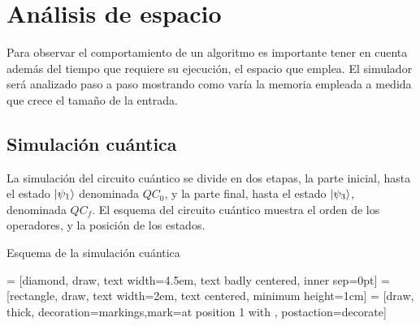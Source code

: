 \section{Análisis de espacio}
Para observar el comportamiento de un algoritmo es importante tener en cuenta 
además del tiempo que requiere su ejecución, el espacio que emplea. El simulador 
será analizado paso a paso mostrando como varía la memoria empleada a medida que 
crece el tamaño de la entrada.

\subsection{Simulación cuántica}
La simulación del circuito cuántico se divide en dos etapas, la parte inicial, 
hasta el estado $\ket{\psi_{1}}$ denominada $QC_0$, y la parte final, hasta el estado 
$\ket{\psi_{3}}$, denominada $QC_f$. El esquema del circuito cuántico muestra el orden 
de los operadores, y la posición de los estados.
%

%
Esquema de la simulación cuántica
%
\begin{center}
 = [diamond, draw, text width=4.5em, text badly centered, 
inner sep=0pt]
 = [rectangle, draw, text width=2em, text centered, minimum 
height=1cm]
 = [draw, thick, decoration={markings,mark=at position 
1 with {}}, postaction={decorate}]
%
\end{center}
%
